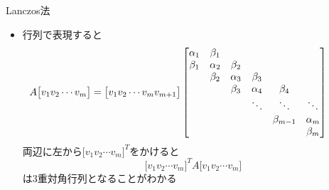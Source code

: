 \begin{frame}[t,fragile]{Lanczos法}
  \begin{itemize}
  \item 行列で表現すると
    \begin{align*}
      \hspace*{-2em}
      A
      \big[ v_1v_2\cdots v_m \big]
      &=
      \big[ v_1v_2\cdots v_m v_{m+1} \big]
      \begin{bmatrix}
        \alpha_1 & \beta_1\\
        \beta_1 & \alpha_2 & \beta_2 \\
        & \beta_2 & \alpha_3 & \beta_3 \\
        & & \beta_3 & \alpha_4 & \beta_4 \\
        & & & \ddots & \ddots & \ddots \\
        & & & & \beta_{m-1} & \alpha_m \\
        & & & & & \beta_m \\
      \end{bmatrix}
    \end{align*}
    両辺に左から$\big[ v_1v_2\cdots v_m \big]^T$をかけると
    \[
    \big[ v_1v_2\cdots v_m \big]^T A \big[ v_1v_2\cdots v_m \big]
    \]
    は3重対角行列となることがわかる
  \end{itemize}
\end{frame}
